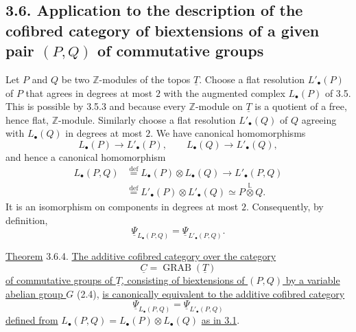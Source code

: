 
\subsection*{3.6. Application to the description of the cofibred
category of biextensions of a given pair $(P,Q)$ of commutative
groups}

Let $P$ and $Q$ be two $\mathbb Z$-modules of the topos
$\underline T$.  Choose a flat resolution $L'_\bullet(P)$ of $P$
that agrees in degrees at most $2$ with the augmented complex
$L_\bullet(P)$ of 3.5.  This is possible by 3.5.3 and because every
$\mathbb Z$-module on $\underline T$ is a quotient of a free, hence
flat, $\mathbb Z$-module.  Similarly choose a flat resolution
$L'_\bullet(Q)$ of $Q$ agreeing with $L_\bullet(Q)$ in degrees at
most $2$.  We have canonical homomorphisms
\begin{equation}\tag{3.6.1}
 L_\bullet(P)\longrightarrow L'_\bullet(P),
 \qquad
 L_\bullet(Q)\longrightarrow L'_\bullet(Q),
\end{equation}
and hence a canonical homomorphism
\begin{equation}\tag{3.6.2}
\begin{split}
 L_\bullet(P,Q)
 &\overset{\mathrm{def}}{=}L_\bullet(P)\otimes L_\bullet(Q)
 \longrightarrow L'_\bullet(P,Q)\\
 &\overset{\mathrm{def}}{=}L'_\bullet(P)\otimes L'_\bullet(Q)
 \simeq P\mathbin{\overset{\mathbb L}{\otimes}}Q.
\end{split}
\end{equation}
It is an isomorphism on components in degrees at most $2$.
Consequently, by definition,
\begin{equation}\tag{3.6.3}
 \underline\Psi_{L_\bullet(P,Q)}
 =
 \underline\Psi_{L'_\bullet(P,Q)}.
\end{equation}

\underline{Theorem} 3.6.4. \underline{The additive cofibred category
over the category}
\[
 \underline C=\operatorname{GRAB}(\underline T)
\]
\underline{of commutative groups of $\underline T$, consisting of
biextensions of $(P,Q)$ by a variable abelian group $G$} (2.4),
\underline{is canonically equivalent to the additive cofibred
category}
\[
 \underline\Psi_{L_\bullet(P,Q)}
 =
 \underline\Psi_{L'_\bullet(P,Q)}
\]
\underline{defined from}
$L_\bullet(P,Q)=L_\bullet(P)\otimes L_\bullet(Q)$
\underline{as in 3.1}.

